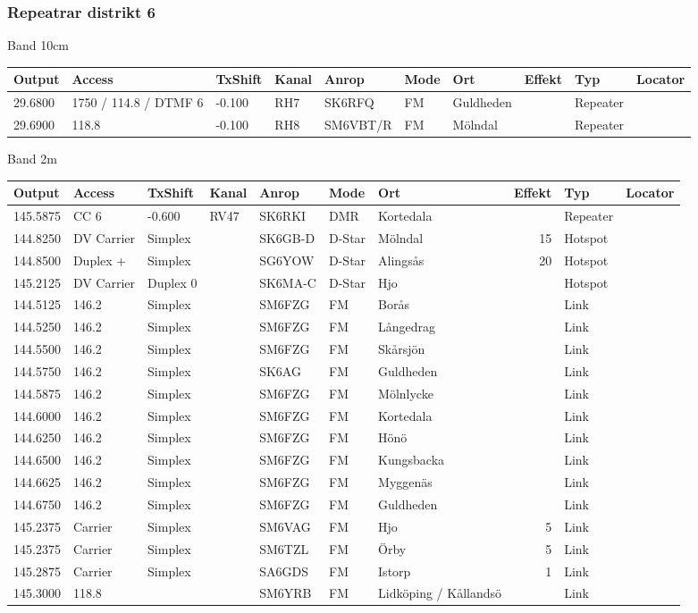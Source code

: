 \subsubsection{Repeatrar distrikt 6}
\large{Band 10cm}
\begin{longtable}{lllllllrlr}
Output & Access & TxShift & Kanal & Anrop & Mode & Ort & Effekt & Typ & Locator \\ \hline
29.6800&1750 / 114.8 / DTMF 6&-0.100&RH7&SK6RFQ&FM&Guldheden&&Repeater&\\
29.6900&118.8&-0.100&RH8&SM6VBT/R&FM&Mölndal&&Repeater&\\
\end{longtable}
\large{Band 2m}
\begin{longtable}{lllllllrlr}
Output & Access & TxShift & Kanal & Anrop & Mode & Ort & Effekt & Typ & Locator \\ \hline
145.5875&CC 6&-0.600&RV47&SK6RKI&DMR&Kortedala&&Repeater&\\
144.8250&DV Carrier&Simplex&&SK6GB-D&D-Star&Mölndal&15&Hotspot&\\
144.8500&Duplex +&Simplex&&SG6YOW&D-Star&Alingsås&20&Hotspot&\\
145.2125&DV Carrier&Duplex 0&&SK6MA-C&D-Star&Hjo&&Hotspot&\\
144.5125&146.2&Simplex&&SM6FZG&FM&Borås&&Link&\\
144.5250&146.2&Simplex&&SM6FZG&FM&Långedrag&&Link&\\
144.5500&146.2&Simplex&&SM6FZG&FM&Skårsjön&&Link&\\
144.5750&146.2&Simplex&&SK6AG&FM&Guldheden&&Link&\\
144.5875&146.2&Simplex&&SM6FZG&FM&Mölnlycke&&Link&\\
144.6000&146.2&Simplex&&SM6FZG&FM&Kortedala&&Link&\\
144.6250&146.2&Simplex&&SM6FZG&FM&Hönö&&Link&\\
144.6500&146.2&Simplex&&SM6FZG&FM&Kungsbacka&&Link&\\
144.6625&146.2&Simplex&&SM6FZG&FM&Myggenäs&&Link&\\
144.6750&146.2&Simplex&&SM6FZG&FM&Guldheden&&Link&\\
145.2375&Carrier&Simplex&&SM6VAG&FM&Hjo&5&Link&\\
145.2375&Carrier&Simplex&&SM6TZL&FM&Örby&5&Link&\\
145.2875&Carrier&Simplex&&SA6GDS&FM&Istorp&1&Link&\\
145.3000&118.8&&&SM6YRB&FM&Lidköping / Kållandsö&&Link&\\

\end{longtable}
